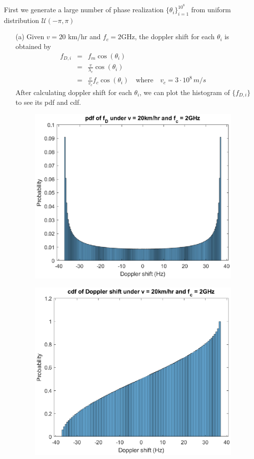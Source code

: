 First we generate a large number of phase realization $\{\theta_i\}_{i=1}^{10^8}$  from uniform distribution $\mathcal{U}(-\pi, \pi)$
\begin{itemize}
    \item[(a)] Given $v = 20$ km/hr and $f_c = 2$GHz, the doppler shift for each $\theta_i$ is obtained by
    \begin{eqnarray*}
        f_{D, i} & = & f_m \cos\left(\theta_i\right) \\
                 & = & \frac{v}{\lambda_c} \cos\left(\theta_i\right) \\
                 & = & \frac{v}{v_c} f_c \cos\left(\theta_i\right) \quad \text{where} \quad v_c = 3 \cdot 10^8 \, m/s
    \end{eqnarray*}
    After calculating doppler shift for each $\theta_i$, we can plot the histogram of $\{f_{D,i}\}$ to see its pdf and cdf.
    \begin{figure}[H]
        \centering
        \includegraphics[scale = 0.8]{a_pdf.eps}
    \end{figure}
    \begin{figure}[H]
        \centering
        \includegraphics[scale = 0.8]{a_cdf.eps}

\end{figure}
\end{itemize}
